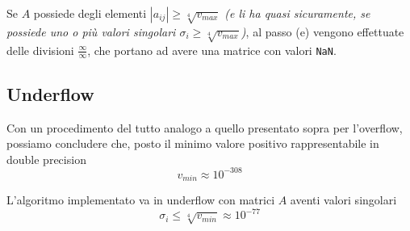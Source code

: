 Se $A$ possiede degli elementi $|a_{ij}| \geq \sqrt[4]{v_{max}}$ \textit{(e li 
ha quasi sicuramente, se possiede uno o più valori singolari $\sigma_i \geq 
\sqrt[4]{v_{max}}$)}, al passo (e) vengono effettuate delle divisioni 
$\frac{\infty}{\infty}$, che portano ad avere una matrice con valori 
\texttt{NaN}.



\subsection{Underflow}
Con un procedimento del tutto analogo a quello presentato sopra per l'overflow, 
possiamo concludere che, posto il minimo valore positivo rappresentabile in 
double 
precision
\begin{equation*}
	v_{min} \approx 10^{-308}
\end{equation*}

L'algoritmo implementato va in underflow con matrici $A$ aventi valori singolari
\begin{equation*}
	\sigma_i \leq \sqrt[4]{v_{min}} \approx 10^{-77}
\end{equation*}

